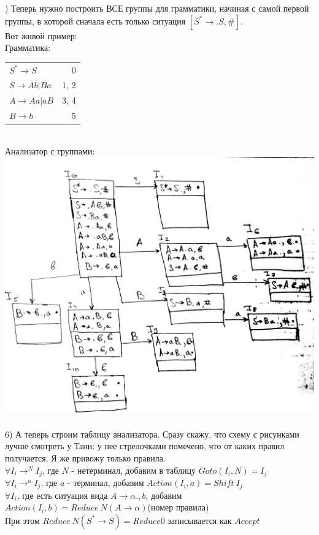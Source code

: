 \documentclass[14pt]{extreport}
\begin{document}
	) Теперь нужно построить ВСЕ группы для грамматики, начиная с самой первой группы, в
	которой сначала есть только ситуация $[S^* \to .S,\#]$.\\
	Вот живой пример:\\
	Грамматика:\\
	\begin{tabular}{lr}
		$S^* \to S$ & 0\\
		$S \to Ab|Ba$ & 1, 2\\
		$A \to Aa | aB$ & 3, 4\\
		$B \to b$ & 5\\
	\end{tabular}\\
	Анализатор с группами:\\
	\includegraphics[scale=0.1]{data/pic8_1.png}\\\\
	6) А теперь строим таблицу анализатора. Сразу скажу, что схему с рисунками лучше
	смотреть у Тани: у нее стрелочками помечено, что от каких правил получается.
	Я же привожу только правила.\\
	$\forall I_i \to^{N} I_j$, где $N$ - нетерминал, добавим в таблицу $Goto(I_i,N)=I_j$\\
	$\forall I_i \to^a I_j$, где $a$ - терминал, добавим $Action(I_i, a)=Shift\ I_j$\\
	$\forall I_i$, где есть ситуация вида $A \to \alpha ., b$, добавим 
	$Action(I_i, b) = Reduce\ N(A \to \alpha)$(номер правила)\\
	При этом $Reduce\ N(S^* \to S) = Reduce 0$ записывается как $Accept$\\
\end{document}
